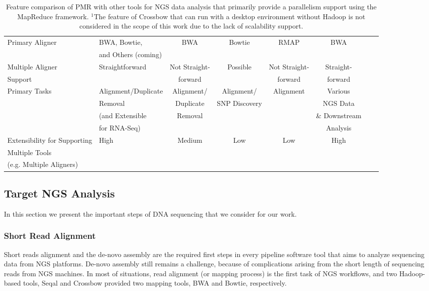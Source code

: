 \documentclass{acm_proc_article-sp}
\begin{document}
\begin{center}
\begin{table}[ht]
{\begin{tabular}{|l|l|c|c|c|c|c|c|}
Primary Aligner &  BWA, Bowtie,  &  BWA & Bowtie & RMAP &  BWA \\
& and Others (coming) &  &  &  &  \\ \hline
Multiple Aligner  & Straightforward & Not Straight- & Possible & Not Straight-  & Straight-  \\ 
Support &  & forward &   & forward  & forward \\\hline
Primary Tasks & Alignment/Duplicate  & Alignment/ & Alignment/ & Alignment &Various\\
  &  Removal & Duplicate & SNP Discovery & & NGS Data  \\  
           & (and Extensible &  Removal & &  & \& Downstream  \\
           & for RNA-Seq) & & &  & Analysis \\ \hline  
Extensibility for Supporting  &  High  & Medium &  Low & Low & High      \\
Multiple Tools  &      &  &  &  &   \\ 
(e.g. Multiple Aligners) & & & & & \\ \hline
\hline
\end{tabular}}
\hfill{}
\caption{Feature comparison of PMR with other tools for NGS data analysis that primarily provide a parallelism support using the MapReduce framework.  $^{1}${The feature of Crossbow that can run with a desktop environment without Hadoop is not considered in the scope of this work due to the lack of scalability support.} }
 \label{table:mr-comparison}
\end{table}
\end{center}


\subsection{Target NGS Analysis}

In this section we present the important steps of DNA sequencing that
we consider for our work.

\subsubsection{Short Read Alignment}

Short reads alignment and the de-novo assembly are the required first
steps in every pipeline software tool that aims to analyze sequencing
data from NGS platforms.  De-novo assembly still remains a challenge,
because of complications arising from the short length of sequencing
reads from NGS machines. In most of situations, read alignment (or mapping process)
is the first task of NGS workflows, and two Hadoop-based tools, Seqal and Crossbow provided two mapping tools, BWA and Bowtie, respectively. 
\end{document}

